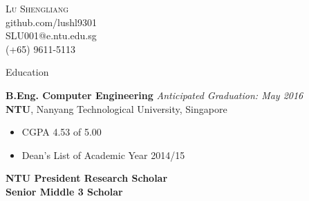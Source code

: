 \documentclass[a4paper, 12pt]{article}
\newenvironment{changemargin}[2]{%
  \begin{list}{}{%
      \setlength{\topsep}{0pt}%
      \setlength{\leftmargin}{#1}%
      \setlength{\rightmargin}{#2}%
      \setlength{\listparindent}{\parindent}%
      \setlength{\itemindent}{\parindent}%
      \setlength{\parsep}{\parskip}%
    }%
  \item[]}{\end{list}
}
\newcommand{\lineover}{
  \begin{changemargin}{-0.05in}{-0.05in}
    \vspace*{-8pt}
    \hrulefill \\
    \vspace*{-2pt}
  \end{changemargin}
}
\newcommand{\header}[1]{
  \begin{changemargin}{-0.6in}{-0.6in}
    \fontsize{15}{15}\scshape{#1}\\
    \lineover
    \vspace*{-4pt}
  \end{changemargin}
}
\newcommand{\contact}[5]{
  \begin{changemargin}{-0.5in}{-0.5in}
    \begin{center}
      {\LARGE \scshape {#1}}\\ \smallskip
      {#2}\\ \smallskip
      {#3}\\ \smallskip
      {#4}   \smallskip
    \end{center}
  \end{changemargin}
}
\newenvironment{body}
{
\vspace*{-16pt}
\begin{changemargin}{-0.25in}{-0.5in}
}
{
\end{changemargin}
}
\begin{document}
\contact{Lu Shengliang}{github.com/lushl9301}{SLU001@e.ntu.edu.sg}{(+65) 9611-5113}





\header{Education}
\begin{body}
  \vspace{14pt}
  \textbf{B.Eng. Computer Engineering} \hfill \emph{Anticipated Graduation: May 2016} \\
  \textbf{NTU}, Nanyang Technological University, Singapore\\
  \begin{itemize} \itemsep -0pt  \small
  \vspace*{-4pt}
  \item CGPA 4.53 of 5.00
  \item Dean's List of Academic Year 2014/15
  \end{itemize}
  \textbf{NTU President Research Scholar}\\
  \smallskip
  \textbf{Senior Middle 3 Scholar}

\end{body}
\end{document}
